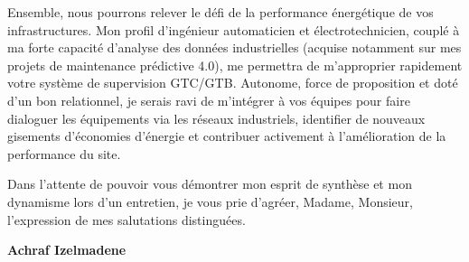 \documentclass[10pt,a4paper]{altacv}
\begin{document}
\vspace{0.4cm}

Ensemble, nous pourrons relever le défi de la performance énergétique de vos infrastructures. Mon profil d'ingénieur automaticien et électrotechnicien, couplé à ma forte capacité d'analyse des données industrielles (acquise notamment sur mes projets de maintenance prédictive 4.0), me permettra de m'approprier rapidement votre système de supervision GTC/GTB. Autonome, force de proposition et doté d'un bon relationnel, je serais ravi de m'intégrer à vos équipes pour faire dialoguer les équipements via les réseaux industriels, identifier de nouveaux gisements d'économies d'énergie et contribuer activement à l'amélioration de la performance du site.

\vspace{0.4cm}

Dans l'attente de pouvoir vous démontrer mon esprit de synthèse et mon dynamisme lors d'un entretien, je vous prie d'agréer, Madame, Monsieur, l'expression de mes salutations distinguées.

\vspace{0.5cm}

\vfill

\begin{flushright}
  \Large\color{emphasis}\textbf{Achraf Izelmadene}
\end{flushright}
\end{document}
